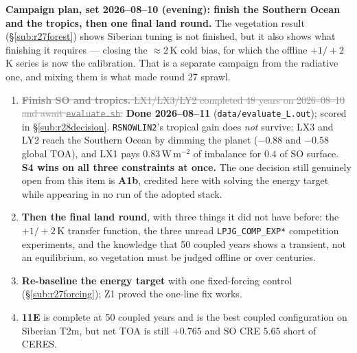 \documentclass[10pt]{article}
\newcommand{\dead}[1]{\textcolor{gray}{\sout{#1}}}
\begin{document}
\textbf{Campaign plan, set 2026--08--10 (evening): finish the Southern Ocean and the
tropics, then one final land round.} The vegetation result (\S\ref{sub:r27forest}) shows
Siberian tuning is not finished, but it also shows what finishing it requires --- closing
the ${\approx}2$\,K cold bias, for which the offline $+1/+2$\,K series is now the
calibration. That is a separate campaign from the radiative one, and mixing them is what
made round 27 sprawl.
\begin{enumerate}\itemsep2pt
\item \dead{\textbf{Finish SO and tropics.} LX1/LX3/LY2 completed 48 years on 2026--08--10
and await \texttt{evaluate.sh}.} \textbf{Done 2026--08--11}
(\texttt{data/evaluate\_L.out}); scored in \S\ref{sub:r28decision}. \texttt{RSNOWLIN2}'s
tropical gain does \emph{not} survive: LX3 and LY2 reach the Southern Ocean by dimming
the planet ($-0.88$ and $-0.58$ global TOA), and LX1 pays $0.83$\,W\,m$^{-2}$ of
imbalance for $0.4$ of SO surface. \textbf{S4 wins on all three constraints at once.}
The one decision still genuinely open from this item is \textbf{A1b}, credited here with
solving the energy target while appearing in no run of the adopted stack.
\item \textbf{Then the final land round}, with three things it did not have before: the
$+1/+2$\,K transfer function, the three unread \texttt{LPJG\_COMP\_EXP*} competition
experiments, and the knowledge that 50 coupled years shows a transient, not an
equilibrium, so vegetation must be judged offline or over centuries.
\item \textbf{Re-baseline the energy target} with one fixed-forcing control
(\S\ref{sub:r27forcing}); Z1 proved the one-line fix works.
\item \textbf{11E} is complete at 50 coupled years and is the best coupled configuration
on Siberian T2m, but net TOA is still $+0.765$ and SO CRE $5.65$ short of CERES.
\end{enumerate}
\end{document}

